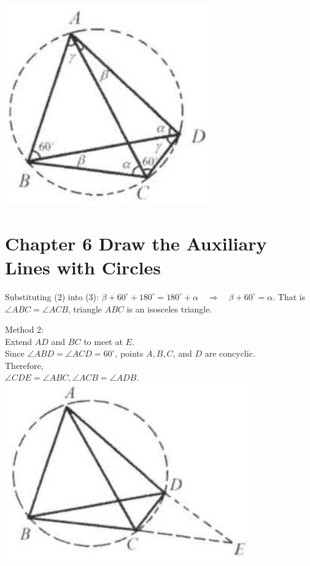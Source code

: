 \documentclass[10pt]{article}
\begin{document}
\includegraphics[max width=\textwidth, center]{2025_04_17_97bc1f7e44d93c271a88g-196(3)}

\section*{Chapter 6 Draw the Auxiliary Lines with Circles}
Substituting (2) into (3): \(\beta+60^{\circ}+180^{\circ}=180^{\circ}+\alpha \quad \Rightarrow \quad \beta+60^{\circ}=\alpha\). That is \(\angle A B C=\angle A C B\), triangle \(A B C\) is an isosceles triangle.

Method 2:\\
Extend \(A D\) and \(B C\) to meet at \(E\).\\
Since \(\angle A B D=\angle A C D=60^{\circ}\), points \(A, B, C\), and \(D\) are concyclic.\\
Therefore,\\
\(\angle C D E=\angle A B C, \angle A C B=\angle A D B\).\\
\includegraphics[max width=\textwidth, center]{2025_04_17_97bc1f7e44d93c271a88g-197}
\end{document}
